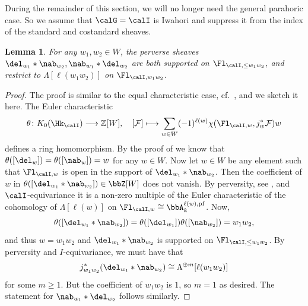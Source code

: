 \documentclass[10pt, reqno]{amsart}
\theoremstyle{plain}
\newtheorem{lemma}[theorem]{Lemma}
\theoremstyle{definition}
\numberwithin{equation}{section}
\begin{document}
	During the remainder of this section, we will no longer need the general parahoric case. So we assume that $\calG=\calI$ is Iwahori and suppress it from the index of the standard and costandard sheaves.
	
	\begin{lemma} \label{wersd;kfdl;}
		For any $w_1,w_2\in W$, the perverse sheaves $\del_{w_1}*\nab_{w_2}, \nab_{w_1}*\del_{w_2}$ are both supported on $\Fl_{\calI,\leq w_1w_2}$, and restrict to $\Lambda[\ell(w_1w_2)]$ on $\Fl_{\calI,w_1w_2}$.
	\end{lemma}
	
	\begin{proof}
		The proof is similar to the equal characteristic case, cf.\ \cite[Lemma 4.1.10]{AR}, and we sketch it here. 
		The Euler characteristic
		\begin{equation}\theta\colon K_0(\Hk_\calI)\longrightarrow \mathbb{Z}[W],\quad [\mathcal{F}]\longmapsto \sum_{w\in W}(-1)^{\ell(w)} \chi(\Fl_{ \calI,w},j_w^*\mathcal{F})w
		\end{equation}
		defines a ring homomorphism. By the proof of  we know that $\theta([\del_w])=\theta([\nab_w])=w$ for any $w\in W$. Now let $w\in W$ be any element such that $\Fl_{\calI,w}$ is open in the support of $\del_{w_1}*\nab_{w_2}$. Then the coefficient of $w$ in $\theta([\del_{w_1}\ast \nab_{w_2}])\in \bbZ[W]$ does not vanish. By perversity, see , and $\calI$-equivariance it is a non-zero multiple of the Euler characteristic of the cohomology of $\Lambda[\ell(w)]$ on $\Fl_{\calI,w }\cong \bbA^{\ell(w),\mathrm{pf}}_k$.
		Now,
		\begin{equation}
			\theta([\del_{w_1}\ast \nab_{w_2}])=\theta([\del_{w_1}])\theta([\nab_{w_2}])=w_1w_2,
		\end{equation}
		and thus $w=w_1w_2$ and $\del_{w_1}\ast \nab_{w_2}$ is supported on $\Fl_{\calI, \leq w_1w_2}$. By perversity and $I$-equivariance, we must have that
		\begin{equation}
			j_{w_1w_2}^*(\del_{w_1}\ast \nab_{w_2})\cong \Lambda^{\oplus m}[\ell(w_1w_2)]
		\end{equation}
		for some $m\geq 1$. But the coefficient of $w_1w_2$ is $1$, so $m=1$ as desired. The statement for $\nab_{w_1}*\del_{w_2}$ follows similarly.
	\end{proof}
	
\end{document}
